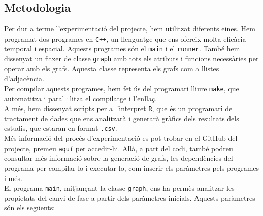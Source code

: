 \documentclass[a4paper]{article}
\begin{document}
	\subsection{Metodologia}
	
	Per dur a terme l'experimentació del projecte, hem utilitzat diferents eines. Hem programat dos programes en \texttt{C++}, un llenguatge que ens ofereix molta eficàcia temporal i espacial. Aquests programes són el \texttt{main} i el \texttt{runner}. També hem dissenyat un fitxer de classe \texttt{graph} amb tots els atributs i funcions necessàries per operar amb els grafs. Aquesta classe representa els grafs com a llistes d'adjacència. \\
	
	Per compilar aquests programes, hem fet ús del programari lliure \texttt{make}, que automatitza i paral·litza el compilatge i l'enllaç. \\
	
	A més, hem dissenyat scripts per a l'interpret \texttt{R}, que és un programari de tractament de dades que ens analitzarà i generarà gràfics dels resultats dels estudis, que estaran en format \texttt{.csv}. \\
	
	Més informació del procés d'experimentació es pot trobar en el GitHub del projecte, premeu \href{https://github.com/Willyllem88/PercolationConnectivity}{\texttt{aquí}} per accedir-hi. Allà, a part del codi, també podreu consultar més informació sobre la generació de grafs, les dependències del programa per compilar-lo i executar-lo, com inserir els paràmetres pels programes i més. \\
	
	El programa \texttt{main}, mitjançant la classe \texttt{graph}, ens ha permès analitzar les propietats del canvi de fase a partir dels paràmetres inicials. Aquests paràmetres són els següents:
	
\end{document}
